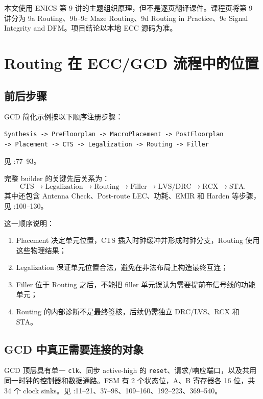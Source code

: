 \documentclass[UTF8,a4paper,11pt,fontset=fandol]{ctexart}
\newcommand{\code}[1]{\nolinkurl{#1}}
\begin{document}
本文使用 ENICS 第 9 讲的主题组织原理，但不是逐页翻译课件。课程页将第 9 讲分为 9a Routing、9b--9c Maze Routing、9d Routing in Practice、9e Signal Integrity and DFM。项目结论以本地 ECC 源码为准。

\section{Routing 在 ECC/GCD 流程中的位置}

\subsection{前后步骤}

GCD 简化示例按以下顺序注册步骤：
\begin{verbatim}
Synthesis -> PreFloorplan -> MacroPlacement -> PostFloorplan
-> Placement -> CTS -> Legalization -> Routing -> Filler
\end{verbatim}
见 :77--93。

完整 builder 的关键先后关系为：
\[
\text{CTS}\rightarrow\text{Legalization}\rightarrow\text{Routing}
\rightarrow\text{Filler}\rightarrow\text{LVS/DRC}
\rightarrow\text{RCX}\rightarrow\text{STA}.
\]
其中还包含 Antenna Check、Post-route LEC、功耗、EMIR 和 Harden 等步骤，见 :100--130。

这一顺序说明：
\begin{enumerate}
  \item Placement 决定单元位置，CTS 插入时钟缓冲并形成时钟分支，Routing 使用这些物理结果；
  \item Legalization 保证单元位置合法，避免在非法布局上构造最终互连；
  \item Filler 位于 Routing 之后，不能把 filler 单元误认为需要提前布信号线的功能单元；
  \item Routing 的内部诊断不是最终签核，后续仍需独立 DRC/LVS、RCX 和 STA。
\end{enumerate}

\subsection{GCD 中真正需要连接的对象}

GCD 顶层具有单一 \code{clk}、同步 active-high 的 \code{reset}、请求/响应端口，以及共用同一时钟的控制器和数据通路。FSM 有 2 个状态位，A、B 寄存器各 16 位，共 34 个 clock sinks。见 :11--21、37--98、109--160、192--223、369--540。
\end{document}
